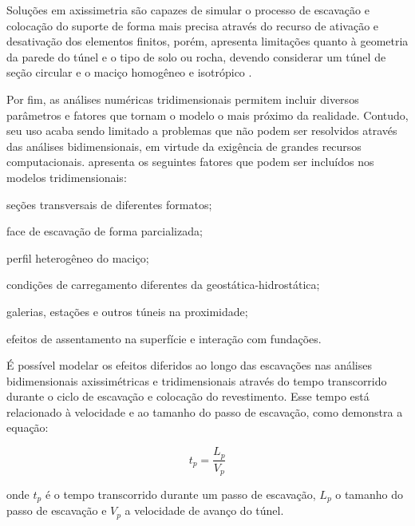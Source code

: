 Soluções em axissimetria são capazes de simular o processo de escavação e colocação do suporte de forma mais precisa através do recurso de ativação e desativação dos elementos finitos, porém, apresenta limitações quanto à geometria da parede do túnel e o tipo de solo ou rocha, devendo considerar um túnel de seção circular e o maciço homogêneo e isotrópico \cite{Quevedo2017}.

Por fim, as análises numéricas tridimensionais permitem incluir diversos parâmetros e fatores que tornam o modelo o mais próximo da realidade. Contudo, seu uso acaba sendo limitado a problemas que não podem ser resolvidos através das análises bidimensionais, em virtude da exigência de grandes recursos computacionais.  apresenta os seguintes fatores que podem ser incluídos nos modelos tridimensionais:

\begin{alineas}
	
	\item seções transversais de diferentes formatos;
	
	\item face de escavação de forma parcializada;
	
	\item perfil heterogêneo do maciço;
	
	\item condições de carregamento diferentes da geostática-hidrostática;
	
	\item galerias, estações e outros túneis na proximidade;
	
	\item efeitos de assentamento na superfície e interação com fundações.
	
\end{alineas}

É possível modelar os efeitos diferidos ao longo das escavações nas análises bidimensionais axissimétricas e tridimensionais através do tempo transcorrido durante o ciclo de escavação e colocação do revestimento. Esse tempo está relacionado à velocidade e ao tamanho do passo de escavação, como demonstra a equação:

\begin{equation}
	t_p = \frac{L_{p}}{V_p}
\end{equation}

onde $t_p$ é o tempo transcorrido durante um passo de escavação, $L_p$ o tamanho do passo de escavação e $V_p$ a velocidade de avanço do túnel.

